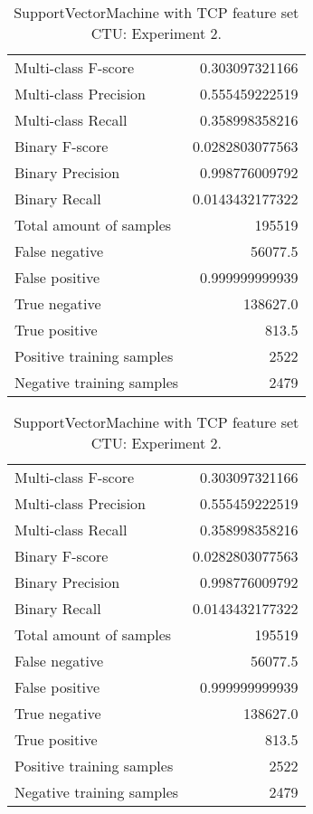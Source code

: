\begin{table}[H]
\begin{minipage}{0.5\textwidth}
\caption{SupportVectorMachine with TCP feature set CTU: Experiment 1.}
\centering
\begin{tabular}{l r}
\toprule
Multi-class F-score & 0.303097321166 \\
Multi-class Precision & 0.555459222519 \\
Multi-class Recall & 0.358998358216 \\
\midrule
Binary F-score & 0.0282803077563 \\
Binary Precision & 0.998776009792 \\
Binary Recall & 0.0143432177322 \\
\midrule
Total amount of samples & 195519 \\
False negative & 56077.5 \\
False positive & 0.999999999939 \\
True negative & 138627.0 \\
True positive & 813.5 \\
\midrule
Positive training samples & 2522 \\
Negative training samples & 2479 \\
\bottomrule
\end{tabular}
\end{minipage}
\hfillx
\begin{minipage}{0.5\textwidth}
\caption{SupportVectorMachine with TCP feature set CTU: Experiment 2.}
\centering
\begin{tabular}{l r}
\toprule
Multi-class F-score & 0.303097321166 \\
Multi-class Precision & 0.555459222519 \\
Multi-class Recall & 0.358998358216 \\
\midrule
Binary F-score & 0.0282803077563 \\
Binary Precision & 0.998776009792 \\
Binary Recall & 0.0143432177322 \\
\midrule
Total amount of samples & 195519 \\
False negative & 56077.5 \\
False positive & 0.999999999939 \\
True negative & 138627.0 \\
True positive & 813.5 \\
\midrule
Positive training samples & 2522 \\
Negative training samples & 2479 \\
\bottomrule
\end{tabular}
\end{minipage}
\end{table}
